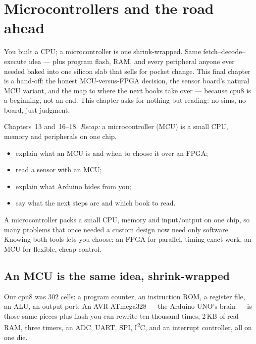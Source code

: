 \chapter{Microcontrollers and the road ahead}\label{ch:mcu}

You built a CPU; a microcontroller is one shrink-wrapped. Same
fetch--decode--execute idea --- plus program flash, RAM, and every
peripheral anyone ever needed baked into one silicon slab that sells
for pocket change. This final chapter is a hand-off: the honest
MCU-versus-FPGA decision, the sensor board's natural MCU variant,
and the map to where the next books take over --- because cpu8 is
a beginning, not an end. This chapter asks for nothing but reading:
no sims, no board, just judgment.

\begin{rulebox}
Chapters~13 and~16--18. \emph{Recap:} a microcontroller (MCU) is a small CPU, memory and peripherals on one chip.
\end{rulebox}
\begin{wins}
\begin{itemize}
\item explain what an MCU is and when to choose it over an FPGA;
\item read a sensor with an MCU;
\item explain what Arduino hides from you;
\item say what the next steps are and which book to read.
\end{itemize}
\end{wins}
\begin{principle}
A microcontroller packs a small CPU, memory and input/output on one chip, so many problems that once needed a custom design now need only software. Knowing both tools lets you choose: an FPGA for parallel, timing-exact work, an MCU for flexible, cheap control.
\end{principle}

\section{An MCU is the same idea, shrink-wrapped}\label{sec:shrink19}

Our cpu8 was 302 cells: a program counter, an instruction ROM, a
register file, an ALU, an output port. An AVR ATmega328 --- the
Arduino UNO's brain --- is those same pieces plus flash you can
rewrite ten thousand times, 2\,KB of real RAM, three timers, an
ADC, UART, SPI, I\textsuperscript{2}C, and an interrupt controller,
all on one die.

